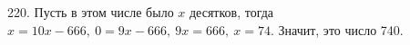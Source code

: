 220. Пусть в этом числе было $x$ десятков, тогда $x=10x-666,\ 0=9x-666,\ 9x=666,\ x=74.$ Значит, это число 740.\\
